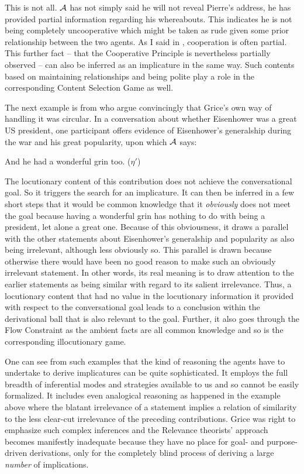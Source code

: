 This is not all. $\cal A$ has not simply said he will not reveal Pierre's address, he has provided partial information regarding his whereabouts. This indicates he is not being completely uncooperative which might be taken as rude given some prior relationship between the two agents. As I said in , cooperation is often partial. This further fact -- that the Cooperative Principle is nevertheless partially observed -- can also be inferred as an implicature in the same way. Such contents based on maintaining relationships and being polite play a role in the corresponding Content Selection Game as well.

The next example is from \citet[22]{huglysayward:implicature} who argue convincingly that Grice's own way of handling it was circular. In a conversation about whether Eisenhower was a great US president, one participant offers evidence of Eisenhower's generalship during the war and his great popularity, upon which $\cal A$ says:

\begin{exe}
\ex And he had a wonderful grin too. ($\eta'$)
\end{exe}

The locutionary content of this contribution does not achieve the conversational goal. So it triggers the search for an implicature. It can then be inferred in a few short steps that it would be common knowledge that it \emph{obviously} does not meet the goal because having a wonderful grin has nothing to do with being a president, let alone a great one. Because of this obviousness, it draws a parallel with the other statements about Eisenhower's generalship and popularity as also being irrelevant, although less obviously so. This parallel is drawn because otherwise there would have been no good reason to make such an obviously irrelevant statement. In other words, its real meaning is to draw attention to the earlier statements as being similar with regard to its salient irrelevance. Thus, a locutionary content that had no value in the locutionary information it provided with respect to the conversational goal leads to a conclusion within the derivational ball that is also relevant to the goal. Further, it also goes through the Flow Constraint as the ambient facts are all common knowledge and so is the corresponding illocutionary game.

One can see from such examples that the kind of reasoning the agents have to undertake to derive implicatures can be quite sophisticated. It employs the full breadth of inferential modes and strategies available to us and so cannot be easily formalized. It includes even analogical reasoning as happened in the example above where the blatant irrelevance of a statement implies a relation of similarity to the less clear-cut irrelevance of the preceding contributions. Grice was right to emphasize such complex inferences and the Relevance theorists' approach becomes manifestly inadequate because they have no place for goal- and purpose-driven derivations, only for the completely blind process of deriving a large \emph{number} of implications. 


